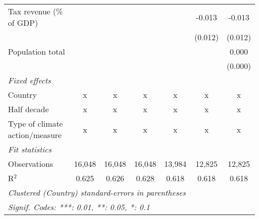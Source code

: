 \begin{tabular}{lcccccc}
   Tax revenue (\% of GDP)                        &         &         &               &              & -0.013        & -0.013\\   
                                                  &         &         &               &              & (0.012)       & (0.012)\\   
   Population total                               &         &         &               &              &               & 0.000\\   
                                                  &         &         &               &              &               & (0.000)\\   
   \emph{Fixed effects}\\
   Country                                        & x       & x       & x             & x            & x             & x\\  
   Half decade                                    & x       & x       & x             & x            & x             & x\\  
   Type of climate action/measure                 & x       & x       & x             & x            & x             & x\\  
   \midrule \emph{Fit statistics}\\
   Observations                                   & 16,048  & 16,048  & 16,048        & 13,984       & 12,825        & 12,825\\  
   R$^2$                                          & 0.625   & 0.626   & 0.628         & 0.618        & 0.618         & 0.618\\  
   \midrule
   \multicolumn{7}{l}{\emph{Clustered (Country) standard-errors in parentheses}}\\
   \multicolumn{7}{l}{\emph{Signif. Codes: ***: 0.01, **: 0.05, *: 0.1}}\\
\end{tabular}
\par\endgroup


